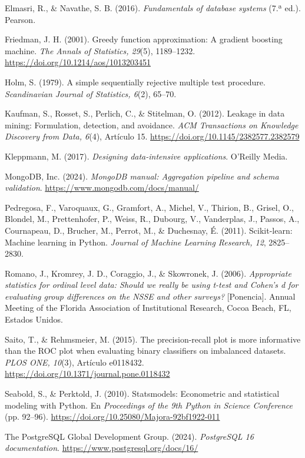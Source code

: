 \documentclass[11pt,a4paper]{article}
\begin{document}
Elmasri, R., \& Navathe, S. B. (2016). \emph{Fundamentals of database systems} (7.ª ed.). Pearson.

Friedman, J. H. (2001). Greedy function approximation: A gradient boosting machine. \emph{The Annals of Statistics, 29}(5), 1189–1232. \url{https://doi.org/10.1214/aos/1013203451}

Holm, S. (1979). A simple sequentially rejective multiple test procedure. \emph{Scandinavian Journal of Statistics, 6}(2), 65–70.

Kaufman, S., Rosset, S., Perlich, C., \& Stitelman, O. (2012). Leakage in data mining: Formulation, detection, and avoidance. \emph{ACM Transactions on Knowledge Discovery from Data, 6}(4), Artículo 15. \url{https://doi.org/10.1145/2382577.2382579}

Kleppmann, M. (2017). \emph{Designing data-intensive applications}. O'Reilly Media.

MongoDB, Inc. (2024). \emph{MongoDB manual: Aggregation pipeline and schema validation}. \url{https://www.mongodb.com/docs/manual/}

Pedregosa, F., Varoquaux, G., Gramfort, A., Michel, V., Thirion, B., Grisel, O., Blondel, M., Prettenhofer, P., Weiss, R., Dubourg, V., Vanderplas, J., Passos, A., Cournapeau, D., Brucher, M., Perrot, M., \& Duchesnay, É. (2011). Scikit-learn: Machine learning in Python. \emph{Journal of Machine Learning Research, 12}, 2825–2830.

Romano, J., Kromrey, J. D., Coraggio, J., \& Skowronek, J. (2006). \emph{Appropriate statistics for ordinal level data: Should we really be using t-test and Cohen's d for evaluating group differences on the NSSE and other surveys?} [Ponencia]. Annual Meeting of the Florida Association of Institutional Research, Cocoa Beach, FL, Estados Unidos.

Saito, T., \& Rehmsmeier, M. (2015). The precision-recall plot is more informative than the ROC plot when evaluating binary classifiers on imbalanced datasets. \emph{PLOS ONE, 10}(3), Artículo e0118432. \url{https://doi.org/10.1371/journal.pone.0118432}

Seabold, S., \& Perktold, J. (2010). Statsmodels: Econometric and statistical modeling with Python. En \emph{Proceedings of the 9th Python in Science Conference} (pp. 92–96). \url{https://doi.org/10.25080/Majora-92bf1922-011}

The PostgreSQL Global Development Group. (2024). \emph{PostgreSQL 16 documentation}. \url{https://www.postgresql.org/docs/16/}
\end{document}
